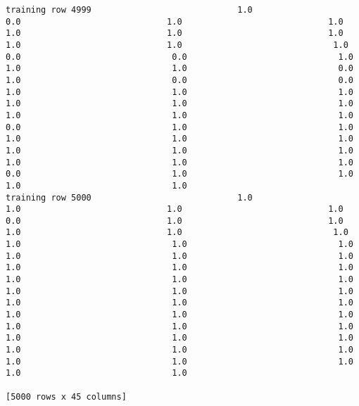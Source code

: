 \documentclass[11pt]{article}
\begin{document}
\begin{verbatim}
training row 4999                             1.0                             0.0                             1.0                             1.0                             1.0                             1.0                             1.0                             1.0                             1.0                              1.0                              0.0                              0.0                              1.0                              1.0                              1.0                              0.0                              1.0                              0.0                              0.0                              1.0                              1.0                              1.0                              1.0                              1.0                              1.0                              1.0                              1.0                              1.0                              0.0                              1.0                              1.0                              1.0                              1.0                              1.0                              1.0                              1.0                              1.0                              1.0                              1.0                              1.0                              0.0                              1.0                              1.0                              1.0                              1.0
training row 5000                             1.0                             1.0                             1.0                             1.0                             0.0                             1.0                             1.0                             1.0                             1.0                              1.0                              1.0                              1.0                              1.0                              1.0                              1.0                              1.0                              1.0                              1.0                              1.0                              1.0                              1.0                              1.0                              1.0                              1.0                              1.0                              1.0                              1.0                              1.0                              1.0                              1.0                              1.0                              1.0                              1.0                              1.0                              1.0                              1.0                              1.0                              1.0                              1.0                              1.0                              1.0                              1.0                              1.0                              1.0                              1.0

[5000 rows x 45 columns]
    \end{verbatim}
\end{document}
